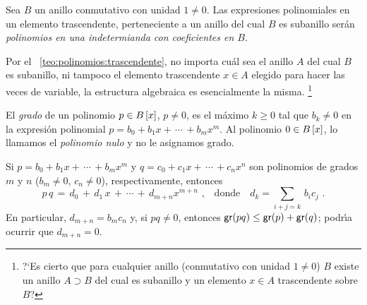 \begin{defPolinomios}\label{def:polinomios:indeterminada}
	Sea $B$ un anillo conmutativo con unidad $1\neq 0$. Las
	expresiones polinomiales en un elemento trascendente,
	perteneciente a un anillo del cual $B$ es subanillo ser\'an
	\emph{polinomios en una indetermianda con coeficientes en $B$}.
\end{defPolinomios}

\begin{obsPolinomios}\label{obs:polinomios:indeterminada}
	Por el \teoname~\ref{teo:polinomios:trascendente}, no importa
	cu\'al sea el anillo $A$ del cual $B$ es subanillo, ni tampoco el
	elemento trascendente $x\in A$ elegido para hacer las veces de
	variable, la estructura algebraica es esencialmente la misma.%
	\footnote{
		?`Es cierto que para cualquier anillo (conmutativo con
		unidad $1\neq 0$) $B$ existe un anillo $A\supset B$ del
		cual es subanillo y un elemento $x\in A$ trascendente
		sobre $B$?
	}
\end{obsPolinomios}

\begin{defPolinomios}\label{def:polinomios:grado}
	El \emph{grado} de un polinomio $p\in\polinomios[x] B$, $p\neq 0$,
	es el m\'aximo $k\geq 0$ tal que $b_k\neq 0$ en la expresi\'on
	polinomial $p=b_0+b_1x+\,\cdots\,+b_mx^m$.
	Al polinomio $0\in\polinomios[x] B$, lo llamamos el
	\emph{polinomio nulo} y no le asignamos grado.
\end{defPolinomios}

Si $p=b_0+b_1x+\,\cdots\,+b_mx^m$ y $q=c_0+c_1x+\,\cdots\,+c_nx^n$ son
polinomios de grados $m$ y $n$ ($b_m\neq 0$, $c_n\neq 0$), respectivamente,
entonces
\begin{displaymath}
	p\,q\,=\,d_0\,+\,d_1\,x\,+\,\cdots\,+\,d_{m+n}x^{m+n}
		\text{ ,}\quad\text{donde}\quad
		d_k=\sum_{i+j=k}\,b_ic_j
	\text{ .}
\end{displaymath}
%
En particular, $d_{m+n}=b_mc_n$ y, si $pq\neq 0$, entonces
$\grado(pq)\leq\grado(p)+\grado(q)$; podr\'{\i}a ocurrir que $d_{m+n}=0$.

